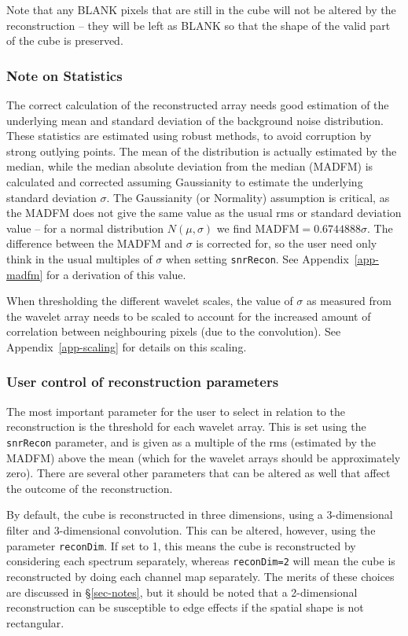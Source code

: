 \documentclass[12pt,a4paper]{article}
\begin{document}
Note that any BLANK pixels that are still in the cube will not be
altered by the reconstruction -- they will be left as BLANK so that
the shape of the valid part of the cube is preserved.

\subsubsection{Note on Statistics}

The correct calculation of the reconstructed array needs good
estimation of the underlying mean and standard deviation of the
background noise distribution. These statistics are estimated using
robust methods, to avoid corruption by strong outlying points. The
mean of the distribution is actually estimated by the median, while
the median absolute deviation from the median (MADFM) is calculated
and corrected assuming Gaussianity to estimate the underlying standard
deviation $\sigma$. The Gaussianity (or Normality) assumption is
critical, as the MADFM does not give the same value as the usual rms
or standard deviation value -- for a normal distribution
$N(\mu,\sigma)$ we find MADFM$=0.6744888\sigma$. The difference
between the MADFM and $\sigma$ is corrected for, so the user need only
think in the usual multiples of $\sigma$ when setting
\texttt{snrRecon}. See Appendix~\ref{app-madfm} for a derivation of
this value.

When thresholding the different wavelet scales, the value of $\sigma$
as measured from the wavelet array needs to be scaled to account for the
increased amount of correlation between neighbouring pixels (due to
the convolution). See Appendix~\ref{app-scaling} for details on this
scaling. 

\subsubsection{User control of reconstruction parameters}

The most important parameter for the user to select in relation to the
reconstruction is the threshold for each wavelet array. This is set
using the \texttt{snrRecon} parameter, and is given as a multiple of the
rms (estimated by the MADFM) above the mean (which for the wavelet
arrays should be approximately zero). There are several other
parameters that can be altered as well that affect the outcome of the
reconstruction. 

By default, the cube is reconstructed in three dimensions, using a
3-dimensional filter and 3-dimensional convolution. This can be
altered, however, using the parameter \texttt{reconDim}. If set to 1,
this means the cube is reconstructed by considering each spectrum
separately, whereas \texttt{reconDim=2} will mean the cube is
reconstructed by doing each channel map separately. The merits of
these choices are discussed in \S\ref{sec-notes}, but it should be
noted that a 2-dimensional reconstruction can be susceptible to edge
effects if the spatial shape is not rectangular.
\end{document}

